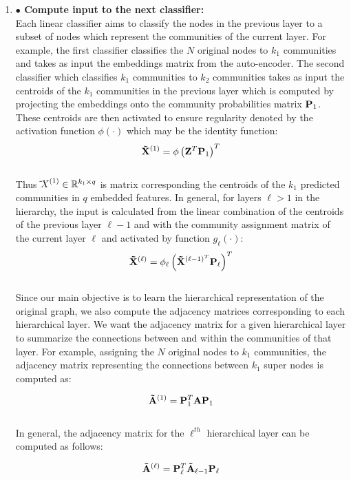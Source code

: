 \documentclass[a4paper,12pt]{article}
\DeclareMathOperator*{\argmax}{arg\,max}
\begin{document}
\begin{itemize}
\begin{enumerate}
{\begin{enumerate}
{					\[ \mathbb{S}_\ell = \argmax_{k_\ell} {\bf C}_{\ell}\]
				}
				
				\item[]{\textbf{$\bullet$ Compute input to the next classifier:}  \\
					Each linear classifier aims to classify the nodes in the previous layer to a subset of nodes which represent the communities of the current layer. For example, the first classifier classifies the $N$ original nodes to $k_1$ communities and takes as input the embeddings matrix from the auto-encoder. The second classifier which classifies $k_1$ communities to $k_2$ communities takes as input the centroids of the $k_1$ communities in the previous layer which is computed by projecting the embeddings onto the community probabilities matrix ${\bf P}_1$. These centroids are then activated to ensure regularity denoted by the activation function $\phi(\cdot)$ which may be the identity function:
					\[ {\bf \tilde {X}}^{(1)}= \phi\left({\bf Z}^T {\bf P}_{1}\right)^T\] 
					\\
					Thus ${\tilde \bf X}^{(1)} \in \mathbb{R}^{k_1 \times q}$ is matrix corresponding the centroids of the $k_1$ predicted communities in $q$ embedded features. In general, for layers $\ell > 1$ in the hierarchy, the input is calculated from the linear combination of the centroids of the previous layer $\ell - 1$ and with the community assignment matrix of the current layer $\ell$ and activated by function $g_\ell(\cdot)$: 
					\[ {\bf \tilde X}^{(\ell)} = \phi_\ell\left({\bf \tilde{X}}^{(\ell-1)^T} {\bf P}_{\ell}\right)^T\] 
					\\
					
					Since our main objective is to learn the hierarchical representation of the original graph, we also compute the adjacency matrices corresponding to each hierarchical layer. We want the adjacency matrix for a given hierarchical layer to summarize the connections between and within the communities of that layer. For example, assigning the $N$ original nodes to $k_1$ communities, the adjacency matrix representing the connections between $k_1$ super nodes is computed as: 
					
					\[ {\bf \tilde A}^{(1)} = {\bf P}_1^T{\bf A}{\bf P}_1\]\\
					
					In general, the adjacency matrix for the $\ell^{th}$ hierarchical layer can be computed as follows:
					
					\[ {\bf \tilde A}^{(\ell)} = {\bf P}_\ell^T{\bf \tilde{A}}_{\ell-1}{\bf P}_\ell \] 
					
}
\end{enumerate}}
\end{enumerate}
\end{itemize}
\end{document}
